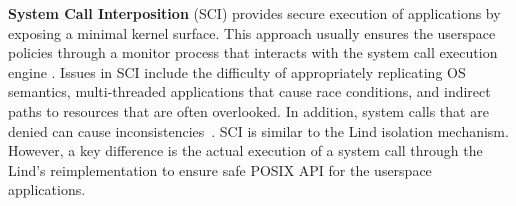 \textbf{System Call Interposition} (SCI) provides
secure execution of applications by exposing a minimal kernel surface.
This approach usually ensures the userspace policies through a monitor process that
interacts with the system call execution engine
\cite{SCI-04}.
Issues in SCI include the difficulty of appropriately replicating OS semantics,
multi-threaded applications that cause race conditions, and indirect paths to resources that are often overlooked.
In addition, system calls that are denied can cause inconsistencies~\cite{Problems-SCI}.
%
%
%
%
%
SCI is similar to the Lind isolation mechanism. However, a key difference is the actual execution
of a system call through the Lind's reimplementation to ensure safe POSIX API for the userspace applications.

